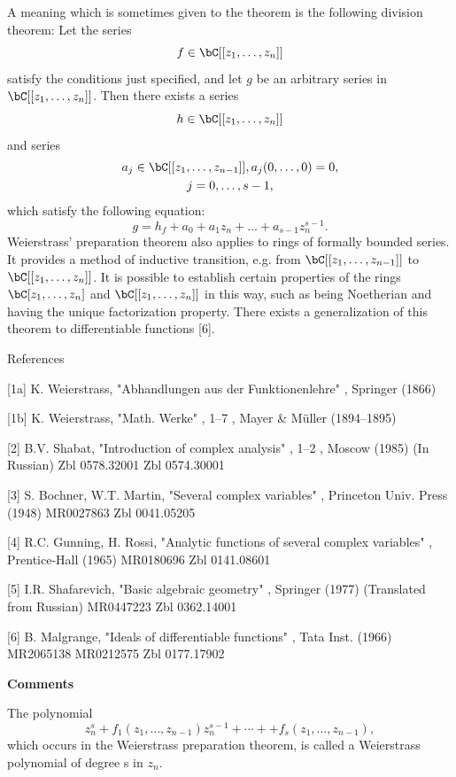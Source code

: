 \documentclass[lang=cn,12pt,fontset=none,a4paper]{beautybook}
\begin{document}
A meaning which is sometimes given to the theorem is the following division theorem: Let the series
$$
   f\in \bC[[z_1,\dots,z_n]]
$$
satisfy the conditions just specified, and let $g$ be an arbitrary series in $\bC[[z_1,\dots,z_n]]$. Then there exists a series
$$
   h\in \bC[[z_1,\dots,z_n]]
$$
and series
$$
   \begin{gathered}
      a_j\in \bC[[z_1,\dots,z_{n-1}]],  a_j (0,\dots,0)=0,\\
      j=0,\dots,s-1,
   \end{gathered}
$$
which satisfy the following equation:
$$
   g=h_f+a_0+a_1z_n+\dots+a_{s-1}z^{s-1}_n.
$$
Weierstrass' preparation theorem also applies to rings of formally bounded series. It provides a method of inductive transition, e.g. from $\bC[[z_1,\dots,z_{n-1}]]$
to $\bC[[z_1,\dots,z_n]]$. It is possible to establish certain properties of the rings $\bC[z_1,\dots,z_n]$ and $\bC[[z_1,\dots,z_n]]$ in this way, such as being Noetherian and having the unique factorization property. There exists a generalization of this theorem to differentiable functions [6].

References

   [1a]	K. Weierstrass, "Abhandlungen aus der Funktionenlehre" , Springer (1866)

[1b]	K. Weierstrass, "Math. Werke" , 1–7 , Mayer \& Müller (1894–1895)

[2]	B.V. Shabat, "Introduction of complex analysis" , 1–2 , Moscow (1985) (In Russian) Zbl 0578.32001 Zbl 0574.30001

   [3]	S. Bochner, W.T. Martin, "Several complex variables" , Princeton Univ. Press (1948) MR0027863 Zbl 0041.05205

   [4]	R.C. Gunning, H. Rossi, "Analytic functions of several complex variables" , Prentice-Hall (1965) MR0180696 Zbl 0141.08601

   [5]	I.R. Shafarevich, "Basic algebraic geometry" , Springer (1977) (Translated from Russian) MR0447223 Zbl 0362.14001

   [6]	B. Malgrange, "Ideals of differentiable functions" , Tata Inst. (1966) MR2065138 MR0212575 Zbl 0177.17902

\textbf{Comments}

The polynomial
$$
   z^s_n+f_1(z_1,\dots,z_{n-1}) z^{s-1}_n+⋯+
   +f_s(z_1,\dots,z_{n-1}),
$$
which occurs in the Weierstrass preparation theorem, is called a Weierstrass polynomial of degree s
in $z_n$.
\end{document}
